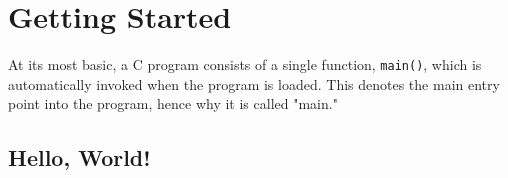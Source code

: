 \documentclass[../main.tex]{subfiles}
\begin{document}
\chapter{Getting Started}

At its most basic, a C program consists of a single function, \lstinline{main()},
which is automatically invoked when the program is loaded. This denotes the main
entry point into the program, hence why it is called "main."

\section{Hello, World!}


\end{document}
